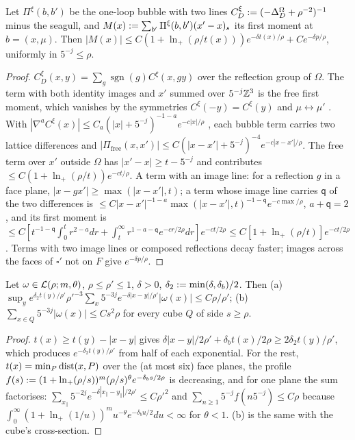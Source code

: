 \begin{lemma}\label{lem:a02:F1}
Let $\Pi^\xi(b,b')$ be the one-loop bubble with two lines $C^\xi_D:=(-\Delta^\Omega_D+\rho^{-2})^{-1}$ minus the seagull, and $M(x):=\sum_{b'}\Pi^\xi(b,b')(x'-x)_s$ its first moment at $b=(x,\mu)$. Then $|M(x)|\le C(1+\ln_+(\rho/t(x)))e^{-\delta t(x)/\rho}+Ce^{-\delta p/\rho}$, uniformly in $5^{-j}\le\rho$.
\end{lemma}
\begin{proof}
$C^\xi_D(x,y)=\sum_{g}\operatorname{sgn}(g)C^\xi(x,gy)$ over the reflection group of $\Omega$. The term with both identity images and $x'$ summed over $5^{-j}\mathbb Z^3$ is the free first moment, which vanishes by the symmetries $C^\xi(-y)=C^\xi(y)$ and $\mu\leftrightarrow\mu'$ \cite[(3.27)--(3.28)]{Ba3}. With $|\nabla^aC^\xi(x)|\le C_a(|x|+5^{-j})^{-1-a}e^{-c|x|/\rho}$ \cite[Thm.~4.3.1, Cor.~4.3.3]{LL10}, each bubble term carries two lattice differences and $|\Pi_{\mathrm{free}}(x,x')|\le C(|x-x'|+5^{-j})^{-4}e^{-c|x-x'|/\rho}$. The free term over $x'$ outside $\Omega$ has $|x'-x|\ge t-5^{-j}$ and contributes $\le C(1+\ln_+(\rho/t))e^{-ct/\rho}$. A term with an image line: for a reflection $g$ in a face plane, $|x-gx'|\ge\max(|x-x'|,t)$; a term whose image line carries $\mathsf q$ of the two differences is $\le C|x-x'|^{-1-a}\max(|x-x'|,t)^{-1-\mathsf q}e^{-c\max/\rho}$, $a+\mathsf q=2$, and its first moment is $\le C[t^{-1-\mathsf q}\int_0^tr^{2-a}dr+\int_t^\infty r^{1-a-\mathsf q}e^{-cr/2\rho}dr]e^{-ct/2\rho}\le C[1+\ln_+(\rho/t)]e^{-ct/2\rho}$. Terms with two image lines or composed reflections decay faster; images across the faces of $\square'$ not on $F$ give $e^{-\delta p/\rho}$.
\end{proof}

\begin{lemma}\label{lem:a02:L}
Let $\omega\in\mathcal L(\rho;m,\theta)$, $\rho\le\rho'\le1$, $\delta>0$, $\delta_2:=\min(\delta,\delta_b)/2$. Then (a) $\sup_ye^{\delta_2t(y)/\rho'}\rho'^{-3}\sum_x5^{-3j}e^{-\delta|x-y|/\rho'}|\omega(x)|\le C\rho/\rho'$; (b) $\sum_{x\in Q}5^{-3j}|\omega(x)|\le Cs^2\rho$ for every cube $Q$ of side $s\ge\rho$.
\end{lemma}
\begin{proof}
$t(x)\ge t(y)-|x-y|$ gives $\delta|x-y|/2\rho'+\delta_bt(x)/2\rho\ge2\delta_2t(y)/\rho'$, which produces $e^{-\delta_2t(y)/\rho'}$ from half of each exponential. For the rest, $t(x)=\min_P\operatorname{dist}(x,P)$ over the (at most six) face planes, the profile $f(s):=(1+\ln_+(\rho/s))^m(\rho/s)^\theta e^{-\delta_bs/2\rho}$ is decreasing, and for one plane the sum factorises: $\sum_{x_\parallel}5^{-2j}e^{-\delta|x_\parallel-y_\parallel|/2\rho'}\le C\rho'^2$ and $\sum_{n\ge1}5^{-j}f(n5^{-j})\le C\rho$ because $\int_0^\infty(1+\ln_+(1/u))^mu^{-\theta}e^{-\delta_bu/2}du<\infty$ for $\theta<1$. (b) is the same with the cube's cross-section.
\end{proof}

